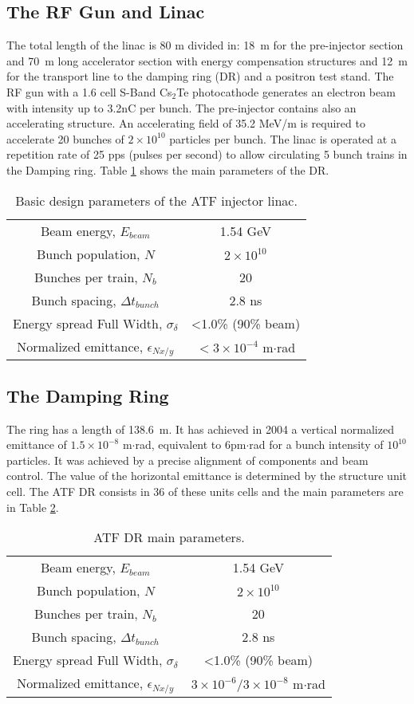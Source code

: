 {{\subsection{The RF Gun and Linac}
The total length of the linac is 80 m divided in: 18~m for the pre-injector section and 70~m long accelerator section with energy compensation structures and 12~m for the transport line to the damping ring (DR) and a positron test stand.
The RF gun with a 1.6 cell S-Band Cs$_2$Te photocathode generates an electron beam with intensity up to 3.2nC per bunch. The pre-injector contains also an accelerating structure. An accelerating field of 35.2 MeV/m is required to accelerate 20 bunches of $2\times10^{10}$ particles per bunch. The linac is operated at a repetition rate of 25 pps (pulses per second) to allow circulating 5 bunch trains in the Damping ring. Table \ref{t:linac} shows the main parameters of the DR.
\begin{table}[hbt]
\centering
 \begin{tabular}{|c|c|}\hline
 Beam energy, $E_{beam}$& 1.54 GeV \\
 Bunch population, $N$& $2\times10^{10}$ \\
 Bunches per train, $N_b$ & 20 \\
 Bunch spacing, $\Delta t_{bunch}$ & 2.8 ns\\
 Energy spread Full Width, $\sigma_\delta$ & <1.0\% (90\% beam)\\
 Normalized emittance, $\epsilon_{Nx/y}$ & $< 3\times 10^{-4}$ m$\cdot$rad\\\hline
 \end{tabular}
 \caption{Basic design parameters of the ATF injector linac.}\label{t:linac}
\end{table}
\subsection{The Damping Ring}
The ring has a length of 138.6~m. It has achieved in 2004 a vertical normalized emittance of $1.5\times10^{-8}$ m$\cdot$rad, equivalent to $6$pm$\cdot$rad for a bunch intensity of $10^{10}$ particles. It was achieved by a precise alignment of components and beam control. The value of the horizontal emittance is determined by the structure unit cell. The ATF DR consists in 36 of 	these units cells and the main parameters are in Table \ref{t:ATFDR}.
\begin{table}[hbt]
\centering
 \begin{tabular}{|c|c|}\hline
 Beam energy, $E_{beam}$& 1.54 GeV \\
 Bunch population, $N$& $2\times10^{10}$ \\
 Bunches per train, $N_b$ & 20 \\
 Bunch spacing, $\Delta t_{bunch}$ & 2.8 ns\\
 Energy spread Full Width, $\sigma_\delta$ & <1.0\% (90\% beam)\\
 Normalized emittance, $\epsilon_{Nx/y}$ & $3\times 10^{-6}/3\times 10^{-8}$ m$\cdot$rad\\\hline 
 \end{tabular}\caption{ATF DR main parameters.}\label{t:ATFDR}
\end{table}
}}
